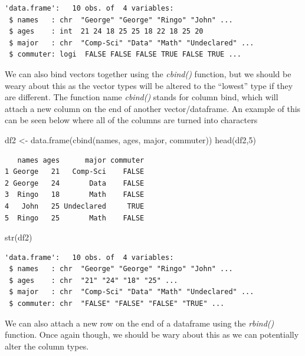 \documentclass[
  letterpaper,
  DIV=11,
  numbers=noendperiod]{scrreprt}
\newenvironment{Shaded}{\begin{snugshade}}{\end{snugshade}}
\newcommand{\DecValTok}[1]{\textcolor[rgb]{0.68,0.00,0.00}{#1}}
\newcommand{\FunctionTok}[1]{\textcolor[rgb]{0.28,0.35,0.67}{#1}}
\newcommand{\NormalTok}[1]{\textcolor[rgb]{0.00,0.23,0.31}{#1}}
\newcommand{\OtherTok}[1]{\textcolor[rgb]{0.00,0.23,0.31}{#1}}
\begin{document}
\begin{verbatim}
'data.frame':   10 obs. of  4 variables:
 $ names   : chr  "George" "George" "Ringo" "John" ...
 $ ages    : int  21 24 18 25 25 18 22 18 25 20
 $ major   : chr  "Comp-Sci" "Data" "Math" "Undeclared" ...
 $ commuter: logi  FALSE FALSE FALSE TRUE FALSE TRUE ...
\end{verbatim}

We can also bind vectors together using the \emph{cbind()} function, but
we should be weary about this as the vector types will be altered to the
``lowest'' type if they are different. The function name \emph{cbind()}
stands for column bind, which will attach a new column on the end of
another vector/dataframe. An example of this can be seen below where all
of the columns are turned into characters

\begin{Shaded}
\begin{Highlighting}[]
\NormalTok{df2 }\OtherTok{\textless{}{-}} \FunctionTok{data.frame}\NormalTok{(}\FunctionTok{cbind}\NormalTok{(names, ages, major, commuter))}
\FunctionTok{head}\NormalTok{(df2,}\DecValTok{5}\NormalTok{)}
\end{Highlighting}
\end{Shaded}

\begin{verbatim}
   names ages      major commuter
1 George   21   Comp-Sci    FALSE
2 George   24       Data    FALSE
3  Ringo   18       Math    FALSE
4   John   25 Undeclared     TRUE
5  Ringo   25       Math    FALSE
\end{verbatim}

\begin{Shaded}
\begin{Highlighting}[]
\FunctionTok{str}\NormalTok{(df2)}
\end{Highlighting}
\end{Shaded}

\begin{verbatim}
'data.frame':   10 obs. of  4 variables:
 $ names   : chr  "George" "George" "Ringo" "John" ...
 $ ages    : chr  "21" "24" "18" "25" ...
 $ major   : chr  "Comp-Sci" "Data" "Math" "Undeclared" ...
 $ commuter: chr  "FALSE" "FALSE" "FALSE" "TRUE" ...
\end{verbatim}

We can also attach a new row on the end of a dataframe using the
\emph{rbind()} function. Once again though, we should be wary about this
as we can potentially alter the column types.
\end{document}
